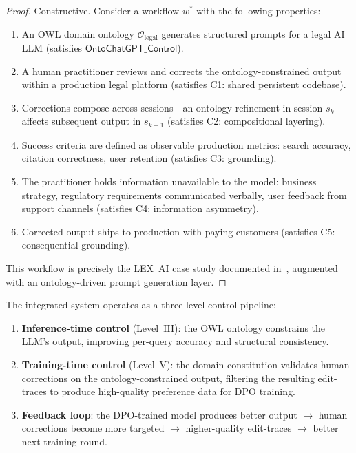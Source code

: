 \documentclass[11pt]{article}
\begin{document}
\begin{proof}
Constructive.
Consider a workflow $w^*$ with the following properties:
\begin{enumerate}[nosep]
  \item An OWL domain ontology $\mathcal{O}_{\text{legal}}$ generates structured prompts for a legal AI LLM (satisfies $\mathsf{OntoChatGPT\_Control}$).
  \item A human practitioner reviews and corrects the ontology-constrained output within a production legal platform (satisfies C1: shared persistent codebase).
  \item Corrections compose across sessions---an ontology refinement in session $s_k$ affects subsequent output in $s_{k+1}$ (satisfies C2: compositional layering).
  \item Success criteria are defined as observable production metrics: search accuracy, citation correctness, user retention (satisfies C3: grounding).
  \item The practitioner holds information unavailable to the model: business strategy, regulatory requirements communicated verbally, user feedback from support channels (satisfies C4: information asymmetry).
  \item Corrected output ships to production with paying customers (satisfies C5: consequential grounding).
\end{enumerate}
This workflow is precisely the LEX~AI case study documented in~\citet{ovcharov2026edittrace}, augmented with an ontology-driven prompt generation layer.
\end{proof}

The integrated system operates as a three-level control pipeline:

\begin{enumerate}[nosep]
  \item \textbf{Inference-time control} (Level~III): the OWL ontology constrains the LLM's output, improving per-query accuracy and structural consistency.
  \item \textbf{Training-time control} (Level~V): the domain constitution validates human corrections on the ontology-constrained output, filtering the resulting edit-traces to produce high-quality preference data for DPO training.
  \item \textbf{Feedback loop}: the DPO-trained model produces better output $\to$ human corrections become more targeted $\to$ higher-quality edit-traces $\to$ better next training round.
\end{enumerate}
\end{document}
